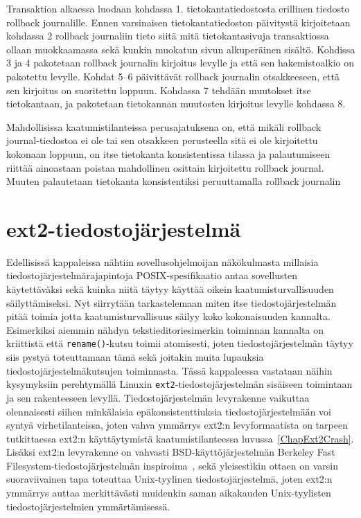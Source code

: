 Transaktion alkaessa luodaan kohdassa 1. tietokantatiedostosta erillinen tiedosto rollback journalille.
Ennen varsinaisen tietokantatiedoston päivitystä kirjoitetaan kohdassa 2 rollback journaliin tieto siitä mitä tietokantasivuja transaktiossa ollaan muokkaamassa sekä kunkin muokatun sivun alkuperäinen sisältö.
Kohdissa 3 ja 4 pakotetaan rollback journalin kirjoitus levylle ja että sen hakemistoalkio on pakotettu levylle.
Kohdat 5--6 päivittävät rollback journalin otsakkeeseen, että sen kirjoitus on suoritettu loppuun.
Kohdassa 7 tehdään muutokset itse tietokantaan, ja pakotetaan tietokannan muutosten kirjoitus levylle kohdassa 8.

Mahdollisissa kaatumistilanteissa perusajatuksena on,
että mikäli rollback journal-tiedostoa ei ole tai sen otsakkeen perusteella sitä ei ole kirjoitettu kokonaan loppuun,
on itse tietokanta konsistentissa tilassa ja palautumiseen riittää ainoastaan poistaa mahdollinen osittain kirjoitettu rollback journal.
Muuten palautetaan tietokanta konsistentiksi peruuttamalla rollback journalin 

\section{ext2-tiedostojärjestelmä}
\label{ChapExt2Fs}
Edellisissä kappaleissa nähtiin sovellusohjelmoijan näkökulmasta millaisia tiedostojärjestelmärajapintoja POSIX-spesifikaatio antaa sovellusten käytettäväksi sekä kuinka niitä täytyy käyttää oikein kaatumisturvallisuuden säilyttämiseksi.
Nyt siirrytään tarkastelemaan miten itse tiedostojärjestelmän pitää toimia jotta kaatumisturvallisuus säilyy koko kokonaisuuden kannalta.
Esimerkiksi aiemmin nähdyn tekstieditoriesimerkin toiminnan kannalta on kriittistä että \texttt{rename()}-kutsu toimii atomisesti,
joten tiedostojärjestelmän täytyy siis pystyä toteuttamaan tämä sekä joitakin muita lupauksia tiedostojärjestelmäkutsujen toiminnasta.
Tässä kappaleessa vastataan näihin kysymyksiin perehtymällä Linuxin \texttt{ext2}-tiedostojärjestelmän sisäiseen toimintaan ja sen rakenteeseen levyllä.
Tiedostojärjestelmän levyrakenne vaikuttaa olennaisesti siihen minkälaisia epäkonsistenttiuksia tiedostojärjestelmään voi syntyä virhetilanteissa,
joten vahva ymmärrys ext2:n levyformaatista on tarpeen tutkittaessa ext2:n käyttäytymistä kaatumistilanteessa luvussa~\ref{ChapExt2Crash}.
Lisäksi ext2:n levyrakenne on vahvasti BSD-käyttöjärjestelmän Berkeley Fast Filesystem-tiedostojärjestelmän inspiroima~\cite{Ext2Design},
sekä yleisestikin ottaen on varsin suoraviivainen tapa toteuttaa Unix-tyylinen tiedostojärjestelmä,
joten ext2:n ymmärrys auttaa merkittävästi muidenkin saman aikakauden Unix-tyylisten tiedostojärjestelmien ymmärtämisessä.

